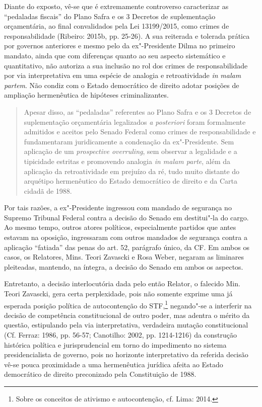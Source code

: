 Diante do exposto, vê-se que é extremamente controverso caracterizar as
``pedaladas fiscais'' do Plano Safra e os 3 Decretos de suplementação
orçamentária, ao final convalidados pela Lei 13199/2015, como crimes de
responsabilidade (Ribeiro: 2015b, pp. 25-26). A sua reiterada e tolerada
prática por governos anteriores e mesmo pelo da ex"-Presidente Dilma no
primeiro mandato, ainda que com diferenças quanto ao seu aspecto
sistemático e quantitativo, não autoriza a sua inclusão no rol dos
crimes de responsabilidade por via interpretativa em uma espécie de
analogia e retroatividade \emph{in} \emph{malam partem}. Não condiz com
o Estado democrático de direito adotar posições de ampliação
hermenêutica de hipóteses criminalizantes.

\begin{quote}
Apesar disso, as ``pedaladas'' referentes ao Plano Safra e os 3 Decretos
de suplementação orçamentária legalizados \emph{a posteriori} foram
formalmente admitidos e aceitos pelo Senado Federal como crimes de
responsabilidade e fundamentaram juridicamente a condenação da
ex"-Presidente. Sem aplicação de um \emph{prospective overruling}, sem
observar a legalidade e a tipicidade estritas e promovendo analogia
\emph{in malam parte}, além da aplicação da retroatividade em prejuízo
da ré, tudo muito distante do arquétipo hermenêutico do Estado
democrático de direito e da Carta cidadã de 1988.
\end{quote}

Por tais razões, a ex"-Presidente ingressou com mandado de segurança no
Supremo Tribunal Federal contra a decisão do Senado em destitui"-la do
cargo. Ao mesmo tempo, outros atores políticos, especialmente partidos
que antes estavam na oposição, ingressaram com outros mandados de
segurança contra a aplicação ``fatiada'' das penas do art. 52, parágrafo
único, da CF. Em ambos os casos, os Relatores, Mins. Teori Zavascki e
Rosa Weber, negaram as liminares pleiteadas, mantendo, na íntegra, a
decisão do Senado em ambos os aspectos.

Entretanto, a decisão interlocutória dada pelo então Relator, o falecido
Min. Teori Zavascki, gera certa perplexidade, pois não somente exprime
uma já esperada posição política de autocontenção do STF,\footnote{Sobre
  os conceitos de ativismo e autocontenção, cf. Lima: 2014.} negando"-se
a interferir na decisão de competência constitucional de outro poder,
mas adentra o mérito da questão, estipulando pela via interpretativa,
verdadeira mutação constitucional (Cf. Ferraz: 1986, pp. 56-57;
Canotilho: 2002, pp. 1214-1216) da construção histórica política e
jurisprudencial em torno do impedimento no sistema presidencialista de
governo, pois no horizonte interpretativo da referida decisão vê-se
pouca proximidade a uma hermenêutica jurídica afeita ao Estado
democrático de direito preconizado pela Constituição de 1988.

